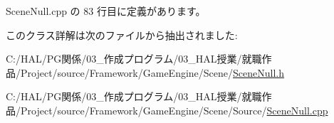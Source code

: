  Scene\+Null.\+cpp の 83 行目に定義があります。



このクラス詳解は次のファイルから抽出されました\+:\begin{DoxyCompactItemize}
\item 
C\+:/\+H\+A\+L/\+P\+G関係/03\+\_\+作成プログラム/03\+\_\+\+H\+A\+L授業/就職作品/\+Project/source/\+Framework/\+Game\+Engine/\+Scene/\mbox{\hyperlink{_scene_null_8h}{Scene\+Null.\+h}}\item 
C\+:/\+H\+A\+L/\+P\+G関係/03\+\_\+作成プログラム/03\+\_\+\+H\+A\+L授業/就職作品/\+Project/source/\+Framework/\+Game\+Engine/\+Scene/\+Source/\mbox{\hyperlink{_scene_null_8cpp}{Scene\+Null.\+cpp}}\end{DoxyCompactItemize}
